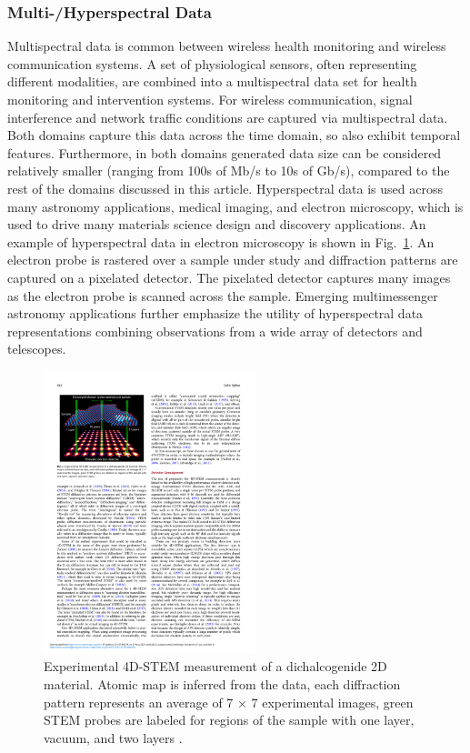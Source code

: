 \subsubsection{Multi-/Hyperspectral Data}
 Multispectral data is common between wireless health monitoring and wireless communication systems. 
 A set of physiological sensors, often representing different modalities, are combined into a multispectral data set for health monitoring and intervention systems. 
 For wireless communication, signal interference and network traffic conditions are captured via multispectral data. 
 Both domains capture this data across the time domain, so also exhibit temporal features. Furthermore, in both domains generated data size can be considered relatively smaller (ranging from 100s of Mb/s to 10s of Gb/s), compared to the rest of the domains discussed in this article. 
 Hyperspectral data is used across many astronomy applications, medical imaging, and electron microscopy, which is used to drive many materials science design and discovery applications. 
 An example of hyperspectral data in electron microscopy is shown in Fig.~\ref{fig:rephyper}.  
 An electron probe is rastered over a sample under study and diffraction patterns are captured on a pixelated detector.  
 The pixelated detector captures many images as the electron probe is scanned across the sample.  Emerging multimessenger astronomy applications further emphasize the utility of hyperspectral data representations combining observations from a wide array of detectors and telescopes. 
 
 \begin{figure}[tbh!]
     \centering
     \includegraphics[width = 0.55\textwidth]{figures/TEM.pdf}
     \caption{Experimental 4D-STEM measurement of a dichalcogenide 2D material. Atomic map is inferred from the data, each diffraction pattern represents an average of 7 × 7 experimental images, green STEM probes are labeled for regions of the sample with one layer, vacuum, and two layers \cite{ophus_2019}.}
     \label{fig:rephyper}
 \end{figure}
 
